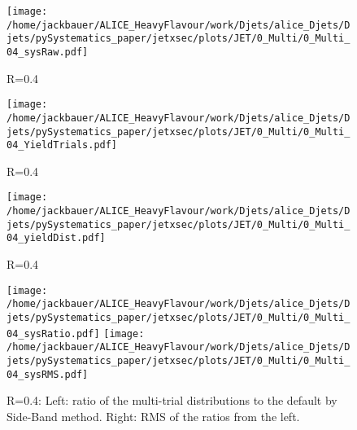 \begin{figure}[bth]
\centering
\texttt{[image: /home/jackbauer/ALICE\_HeavyFlavour/work/Djets/alice\_Djets/Djets/pySystematics\_paper/jetxsec/plots/JET/0\_Multi/0\_Multi\_04\_sysRaw.pdf]}
\caption{R=0.4}
\label{fig:MTYieldsPerDptBin_pp_DzeroR04}
\end{figure}
\begin{figure}[bth]
\centering
\texttt{[image: /home/jackbauer/ALICE\_HeavyFlavour/work/Djets/alice\_Djets/Djets/pySystematics\_paper/jetxsec/plots/JET/0\_Multi/0\_Multi\_04\_YieldTrials.pdf]}
\caption{R=0.4
}
\label{fig:MTYieldsPerJetBin_pp_DzeroR04}
\end{figure}
\begin{figure}[bth]
\centering
\texttt{[image: /home/jackbauer/ALICE\_HeavyFlavour/work/Djets/alice\_Djets/Djets/pySystematics\_paper/jetxsec/plots/JET/0\_Multi/0\_Multi\_04\_yieldDist.pdf]}
\caption{R=0.4}
\label{fig:MTYieldDistPerJetBin_pp_DzeroR04}
\end{figure}
\begin{figure}[bth]
\centering
\texttt{[image: /home/jackbauer/ALICE\_HeavyFlavour/work/Djets/alice\_Djets/Djets/pySystematics\_paper/jetxsec/plots/JET/0\_Multi/0\_Multi\_04\_sysRatio.pdf]}
\texttt{[image: /home/jackbauer/ALICE\_HeavyFlavour/work/Djets/alice\_Djets/Djets/pySystematics\_paper/jetxsec/plots/JET/0\_Multi/0\_Multi\_04\_sysRMS.pdf]}
\caption{R=0.4: Left: ratio of the multi-trial distributions to the default by Side-Band method. Right: RMS of the ratios from the left. 
}
\label{fig:MTRatioRMS_pp_DzeroR04}
\end{figure}

